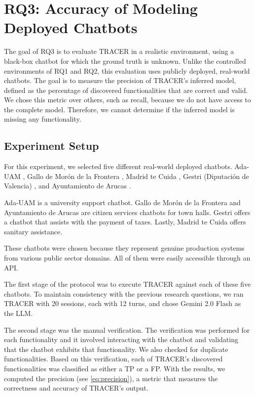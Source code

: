 \section{RQ3: Accuracy of Modeling Deployed Chatbots}

The goal of RQ3 is to evaluate \ac{TRACER} in a realistic environment,
using a black-box chatbot for which the ground truth is unknown.
Unlike the controlled environments of RQ1 and RQ2,
this evaluation uses publicly deployed, real-world chatbots.
The goal is to measure the precision of \ac{TRACER}'s inferred model,
defined as the percentage of discovered functionalities that are correct and valid.
We chose this metric over others, such as recall,
because we do not have access to the complete model.
Therefore, we cannot determine
if the inferred model is missing any functionality.

\subsection{Experiment Setup}

For this experiment, we selected five different real-world deployed chatbots.
Ada-UAM \autocite{AdaUAM},
Gallo de Morón de la Frontera \autocite{AyuntamientoMoronFrontera},
Madrid te Cuida \autocite{ChatbotMadridTe},
Gestri (Diputación de Valencia) \autocite{DiputacionAtiendeMas},
and Ayuntamiento de Arucas \autocite{AyuntamientoArucasASISTENTES}.

Ada-UAM is a university support chatbot.
Gallo de Morón de la Frontera and Ayuntamiento de Arucas
are citizen services chatbots for town halls.
Gestri offers a chatbot that assists with the payment of taxes.
Lastly, Madrid te Cuida offers sanitary assistance.

These chatbots were chosen because they represent
genuine production systems from various public sector domains.
All of them were easily accessible through an \ac{API}.

The first stage of the protocol was to execute \ac{TRACER}
against each of these five chatbots.
To maintain consistency with the previous research questions,
we ran \ac{TRACER} with 20 sessions, each with 12 turns,
and chose Gemini 2.0 Flash as the \ac{LLM}.

The second stage was the manual verification.
The verification was performed for each functionality
and it involved interacting with the chatbot
and validating that the chatbot exhibits that functionality.
We also checked for duplicate functionalities.
Based on this verification,
each of TRACER's discovered functionalities was classified
as either a \ac{TP} or a \ac{FP}.
With the results, we computed the precision
(see \autoref{eq:precision}),
a metric that measures the correctness and accuracy of
\ac{TRACER}'s output.


